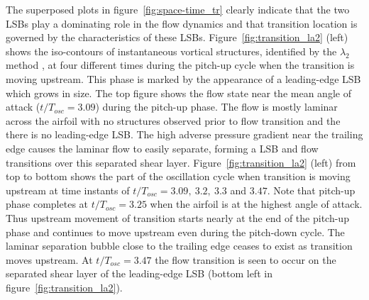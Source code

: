 The superposed plots in figure~\ref{fig:space-time_tr} clearly indicate that the two LSBs play a dominating role in the flow dynamics and that transition location is governed by the characteristics of these LSBs. Figure~\ref{fig:transition_la2} (left) shows the iso-contours of instantaneous vortical structures, identified by the $\lambda_{2}$ method \citep{jeong95}, at four different times during the pitch-up cycle when the transition is moving upstream. This phase is marked by the appearance of a leading-edge LSB which grows in size. The top figure shows the flow state near the mean angle of attack ($t/T_{osc}=3.09$) during the pitch-up phase. The flow is mostly laminar across the airfoil with no structures observed prior to flow transition and the there is no leading-edge LSB. The high adverse pressure gradient near the trailing edge causes the laminar flow to easily separate, forming a LSB and flow transitions over this separated shear layer. Figure~\ref{fig:transition_la2} (left) from top to bottom shows the part of the oscillation cycle when transition is moving upstream at time instants of $t/T_{osc}=3.09,\ 3.2,\ 3.3$ and $3.47$. Note that pitch-up phase completes at $t/T_{osc}=3.25$ when the airfoil is at the highest angle of attack. Thus upstream movement of transition starts nearly at the end of the pitch-up phase and continues to move upstream even during the pitch-down cycle. The laminar separation bubble close to the trailing edge ceases to exist as transition moves upstream. At $t/T_{osc}=3.47$ the flow transition is seen to occur on the separated shear layer of the leading-edge LSB (bottom left in figure~\ref{fig:transition_la2}).
